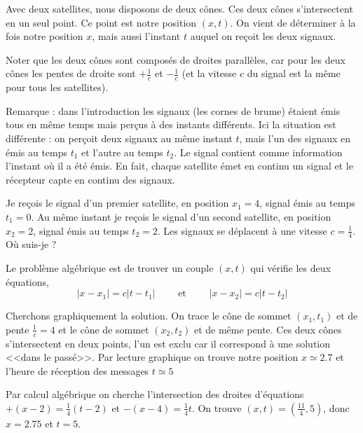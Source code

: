 \documentclass[class=report,crop=false]{standalone}
\begin{document}
Avec deux satellites, nous disposons de deux cônes.
Ces deux cônes s'intersectent en un seul point. Ce point est notre position
$(x,t)$. On vient de déterminer à la fois notre position $x$, mais aussi 
l'instant $t$ auquel on reçoit les deux signaux.

Noter que les deux cônes sont composés de droites parallèles, car pour les deux cônes
les pentes de droite sont $+\frac1c$ et $-\frac1c$ (et la vitesse $c$ du signal est la même pour tous les satellites).

\bigskip

Remarque : dans l'introduction les signaux (les cornes de brume) étaient émis tous en même temps mais
perçus à des instants différents. Ici la situation est différente : on perçoit deux signaux au même instant
$t$, mais l'un des signaux en émis au temps $t_1$ et l'autre au temps $t_2$. 
Le signal contient comme information l'instant où il a été émis. En fait, chaque satellite émet en continu un signal et le récepteur capte en continu des signaux.


\bigskip

\begin{exemple}
Je reçois le signal d'un premier satellite, 
en position $x_1=4$, signal émis au temps $t_1=0$.
Au même instant je reçois le signal d'un second satellite, 
en position $x_2=2$, signal émis au temps $t_2=2$.
Les signaux se déplacent à une vitesse $c=\frac14$. 
Où suis-je ?

\bigskip

Le problème algébrique est de trouver un couple $(x,t)$ qui vérifie les deux équations,
$$|x-x_1| = c |t-t_1| \qquad \text{ et } \qquad  |x-x_2| = c |t-t_2|$$

Cherchons graphiquement la solution. On trace 
le cône de sommet $(x_1,t_1)$ et de pente $\frac1c=4$
et le cône de sommet $(x_2,t_2)$ et de même pente.
Ces deux cônes s'intersectent en deux points, l'un est exclu car il correspond
à une solution <<dans le passé>>. Par lecture graphique
on trouve notre position $x \simeq \num{2.7}$ et l'heure de réception des messages $t\simeq 5$


Par calcul algébrique on cherche l'intersection des droites d'équations
$+(x-2)=\frac14(t-2)$ et $-(x-4)=\frac14 t$. On trouve $(x,t) = (\frac{11}{4},5)$,
donc $x=\num{2.75}$ et $t=5$.


\end{exemple}
\end{document}
